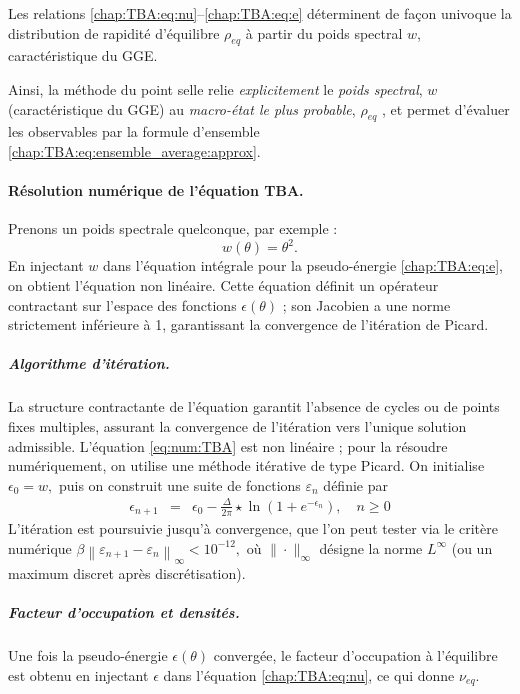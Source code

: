Les relations \eqref{chap:TBA:eq:nu}–\eqref{chap:TBA:eq:e} déterminent de façon univoque la distribution de rapidité d’équilibre \(\rho_{\!eq}\) à partir du poids spectral \(w\), caractéristique du GGE.

\medskip
Ainsi, la méthode du point selle relie \emph{explicitement} le {\em poids spectral}, $w$  (caractéristique du GGE) au \emph{macro-état le plus probable}, $\rho_{eq}$ , et permet d’évaluer les observables par la formule d’ensemble \eqref{chap:TBA:eq:ensemble_average:approx}.


\paragraph{Résolution numérique de l’équation TBA.}\label{para-algho-TBA}

Prenons un poids spectrale quelconque, par exemple : 
\begin{equation}
  w(\theta)= \theta^2 .\label{eq:TBA:w:quadra}
\end{equation} 
En injectant $w$ dans l’équation intégrale pour la pseudo-énergie \eqref{chap:TBA:eq:e}, on obtient l’équation non linéaire.
Cette équation définit un opérateur contractant sur l’espace des fonctions
\( \epsilon(\theta) \) ; son Jacobien a une norme strictement
inférieure à 1, garantissant la convergence de l’itération de Picard.

\medskip
\subparagraph{Algorithme d’itération.}  
La structure contractante de l’équation garantit l’absence de cycles ou de points fixes multiples, assurant la convergence de l’itération vers l’unique solution admissible.
L’équation \eqref{eq:num:TBA} est non linéaire ; pour la résoudre numériquement, on utilise une méthode itérative de type Picard. On initialise
\(
  \epsilon_0 = w ,
\)
puis on construit une suite de fonctions \(\varepsilon_n\) définie par
\begin{eqnarray*}
	\epsilon_{n+1} & = & \epsilon_0 -   \frac{\Delta}{2\pi} \star \ln \left( 1 + e^{-\epsilon_n} \right) ,\quad n\ge0
\end{eqnarray*}
L’itération est poursuivie jusqu’à convergence, que l’on peut tester via le critère numérique
\(
  \beta \left\| \varepsilon_{n+1} - \varepsilon_n \right\|_\infty < 10^{-12},
\)
où \(\|\cdot\|_\infty\) désigne la norme \(L^\infty\) (ou un maximum discret après discrétisation).


\medskip
\subparagraph{Facteur d’occupation et densités.}  
Une fois la pseudo-énergie \( \epsilon(\theta) \) convergée, le facteur d’occupation  à l'équilibre est obtenu en injectant $\epsilon$ dans l’équation \eqref{chap:TBA:eq:nu}, ce qui donne  $\nu_{\!eq}$.
 

